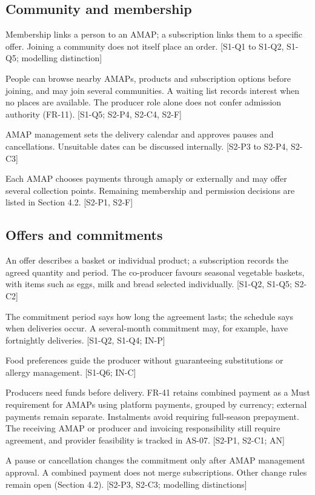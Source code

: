 \documentclass[11pt,a4paper]{article}
\begin{document}
\subsection{Community and membership}

Membership links a person to an AMAP; a subscription links them to a specific offer. Joining a community does not itself place an order. [S1-Q1 to S1-Q2, S1-Q5; modelling distinction]

People can browse nearby AMAPs, products and subscription options before joining, and may join several communities. A waiting list records interest when no places are available. The producer role alone does not confer admission authority (FR-11). [S1-Q5; S2-P4, S2-C4, S2-F]

AMAP management sets the delivery calendar and approves pauses and cancellations. Unsuitable dates can be discussed internally. [S2-P3 to S2-P4, S2-C3]

Each AMAP chooses payments through amaply or externally and may offer several collection points. Remaining membership and permission decisions are listed in Section 4.2. [S2-P1, S2-F]


\subsection{Offers and commitments}

An offer describes a basket or individual product; a subscription records the agreed quantity and period. The co-producer favours seasonal vegetable baskets, with items such as eggs, milk and bread selected individually. [S1-Q2, S1-Q5; S2-C2]

The commitment period says how long the agreement lasts; the schedule says when deliveries occur. A several-month commitment may, for example, have fortnightly deliveries. [S1-Q2, S1-Q4; IN-P]

Food preferences guide the producer without guaranteeing substitutions or allergy management. [S1-Q6; IN-C]

Producers need funds before delivery. FR-41 retains combined payment as a Must requirement for AMAPs using platform payments, grouped by currency; external payments remain separate. Instalments avoid requiring full-season prepayment. The receiving AMAP or producer and invoicing responsibility still require agreement, and provider feasibility is tracked in AS-07. [S2-P1, S2-C1; AN]

A pause or cancellation changes the commitment only after AMAP management approval. A combined payment does not merge subscriptions. Other change rules remain open (Section 4.2). [S2-P3, S2-C3; modelling distinctions]
\end{document}
